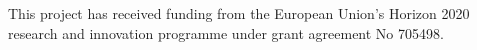 This project has received funding from the European Union's Horizon 2020 research and innovation programme under grant agreement No 705498.
